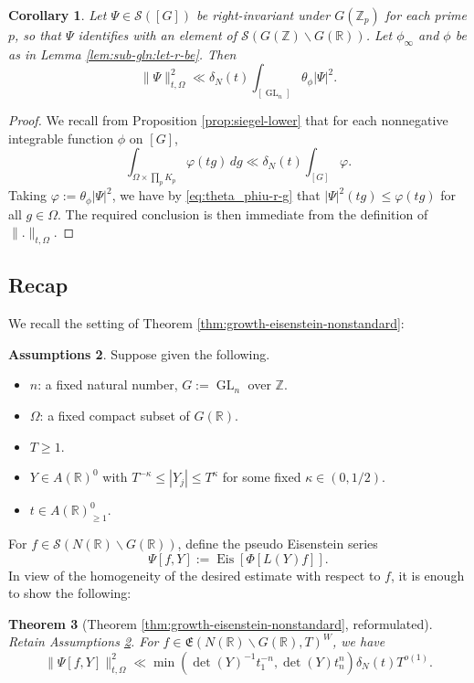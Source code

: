 \documentclass[reqno]{amsart}
\DeclareMathOperator{\GL}{GL}
\DeclareMathOperator{\Eis}{Eis}
\theoremstyle{plain} \newtheorem{theorem} {Theorem}
\newtheorem{corollary} [theorem] {Corollary}
\theoremstyle{definition} \newtheorem{definition} [theorem] {Definition}
\newtheorem{assumptions} [theorem] {Assumptions}
\theoremstyle{itplain} %
\numberwithin{equation}{section}
\numberwithin{theorem}{section}
\renewcommand{\geq}{\geqslant}
\renewcommand{\leq}{\leqslant}
\begin{document}
\begin{corollary}\label{cor:sub-gln:let-psi-in}
  Let $\Psi \in \mathcal{S}([G])$ be right-invariant under $G(\mathbb{Z}_p)$ for each prime $p$, so that $\Psi$ identifies with an element of $\mathcal{S}(G(\mathbb{Z}) \backslash G(\mathbb{R}))$.  Let $\phi_\infty$ and $\phi$ be as in Lemma \ref{lem:sub-gln:let-r-be}.   Then
  \begin{equation*}
    \|\Psi \|_{t,\Omega}^2
    \ll
    \delta_N(t)
    \int _{[\GL_n]} \theta_\phi |\Psi|^2.
  \end{equation*}
\end{corollary}
\begin{proof}
  We recall from Proposition \ref{prop:siegel-lower} that for each nonnegative integrable function $\phi$ on $[G]$,
  \begin{equation*}
    \int _{\Omega \times \prod_p K_p} \varphi(t g) \, d g \ll \delta_N(t) \int _{[G]} \varphi.
  \end{equation*}
  Taking $\varphi := \theta_\phi |\Psi|^2$, we have by  \eqref{eq:theta_phiu-r-g} that $|\Psi|^2(t g) \leq \varphi(t g)$ for all $g \in \Omega$.  The required conclusion is then immediate from the definition of $\|.\|_{t,\Omega}$.
\end{proof}



\subsection{Recap}
We recall the setting of Theorem \ref{thm:growth-eisenstein-nonstandard}:
\begin{assumptions}\label{assumptions-part-5}
  Suppose given the following.
\begin{itemize}
\item $n$: a fixed natural number, $G := \GL_n$ over $\mathbb{Z}$.
\item $\Omega$: a fixed compact subset of $G(\mathbb{R})$.
\item $T \geq 1$.
\item $Y \in A(\mathbb{R})^0$ with $T^{-\kappa} \leq |Y_j| \leq T^{\kappa}$ for some fixed $\kappa \in (0,1/2)$.
\item $t \in A(\mathbb{R})^0_{\geq 1}$.
\end{itemize}
\end{assumptions}
For $f \in \mathcal{S}(N(\mathbb{R}) \backslash G(\mathbb{R}))$, define  the pseudo Eisenstein series
  \begin{equation*}
    \Psi[f,Y] := \Eis[\Phi[L(Y) f]].
  \end{equation*}
In view of the homogeneity of the desired estimate with respect to $f$, it is enough to show the following:
\begin{theorem}[Theorem \ref{thm:growth-eisenstein-nonstandard}, reformulated]
  Retain Assumptions \ref{assumptions-part-5}.  For $f \in \mathfrak{E}(N(\mathbb{R}) \backslash G(\mathbb{R}), T)^W$, we have
  \begin{equation}\label{eq:psiy_r2-ll-dety}
    \|\Psi[f,Y]\|_{t,\Omega}^2 \ll \min ( \det(Y)^{-1} t_1^{-n}, \det(Y) t_n^n ) \delta_N(t) T^{o(1)}.
  \end{equation}
\end{theorem}
\end{document}
